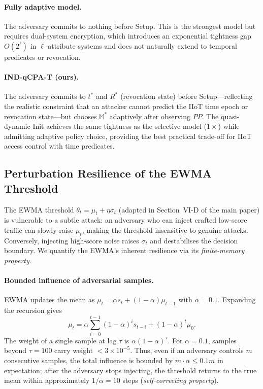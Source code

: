 \documentclass[lettersize,journal]{IEEEtran}
\begin{document}
\paragraph{Fully adaptive model.} The adversary commits to nothing before
Setup. This is the strongest model but requires dual-system encryption,
which introduces an exponential tightness gap $O(2^\ell)$ in $\ell$-attribute
systems and does not naturally extend to temporal predicates or revocation.

\paragraph{IND-qCPA-T (ours).} The adversary commits to $t^*$ and $R^*$
(revocation state) before Setup---reflecting the realistic constraint that
an attacker cannot predict the IIoT time epoch or revocation state---but
chooses $\mathbb{M}^*$ adaptively after observing $PP$. The quasi-dynamic
Init achieves the same tightness as the selective model ($1\times$) while
admitting adaptive policy choice, providing the best practical trade-off
for IIoT access control with time predicates.

\subsection{Perturbation Resilience of the EWMA Threshold}
\label{subsec:ewma_resilience}

The EWMA threshold $\theta_t = \mu_t + \eta \sigma_t$ (adapted in
Section~VI-D of the main paper) is vulnerable to a subtle attack: an
adversary who can inject crafted low-score traffic can slowly raise
$\mu_t$, making the threshold insensitive to genuine attacks. Conversely,
injecting high-score noise raises $\sigma_t$ and destabilises the
decision boundary. We quantify the EWMA's inherent resilience via its
\emph{finite-memory property}.

\paragraph{Bounded influence of adversarial samples.}
EWMA updates the mean as $\mu_t = \alpha s_t + (1-\alpha)\mu_{t-1}$ with
$\alpha = 0.1$. Expanding the recursion gives
\begin{equation}
\mu_t = \alpha \sum_{i=0}^{t-1} (1-\alpha)^i s_{t-i} + (1-\alpha)^t \mu_0.
\label{eq:ewma_expand}
\end{equation}
The weight of a single sample at lag $\tau$ is $\alpha(1-\alpha)^\tau$.
For $\alpha=0.1$, samples beyond $\tau=100$ carry weight $< 3\times 10^{-5}$.
Thus, even if an adversary controls $m$ consecutive samples, the total
influence is bounded by $m \cdot \alpha \leq 0.1 m$ in expectation;
after the adversary stops injecting, the threshold returns to the true
mean within approximately $1/\alpha = 10$ steps (\emph{self-correcting
property}).
\end{document}
